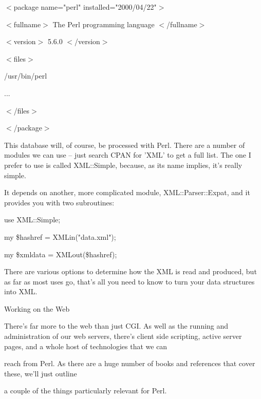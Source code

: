 \documentclass[a4paper,11pt]{book}
\begin{document}
\noindent 

\noindent $<$package name="perl" installed="2000/04/22"$>$

\noindent $<$fullname$>$ The Perl programming language $<$/fullname$>$

\noindent $<$version$>$ 5.6.0 $<$/version$>$

\noindent $<$files$>$

\noindent /usr/bin/perl

\noindent ... 

\noindent $<$/files$>$

\noindent $<$/package$>$

\noindent 

\noindent This database will, of course, be processed with Perl. There are a number of modules we can use -- just search CPAN for 'XML' to get a full list. The one I prefer to use is called XML::Simple, because, as its name implies, it's really simple.

\noindent 

\noindent It depends on another, more complicated module, XML::Parser::Expat, and it provides you with two subroutines:

\noindent 

\noindent 

\noindent use XML::Simple;

\noindent my \$hashref = XMLin("data.xml");

\noindent my \$xmldata = XMLout(\$hashref);

\noindent 

\noindent There are various options to determine how the XML is read and produced, but as far as most uses go, that's all you need to know to turn your data structures into XML.

\noindent 

\noindent 

\noindent Working on the Web

\noindent 

\noindent There's far more to the web than just CGI. As well as the running and administration of our web servers, there's client side scripting, active server pages, and a whole host of technologies that we can

\noindent reach from Perl. As there are a huge number of books and references that cover these, we'll just outline

\noindent a couple of the things particularly relevant for Perl.

\noindent 
\end{document}
